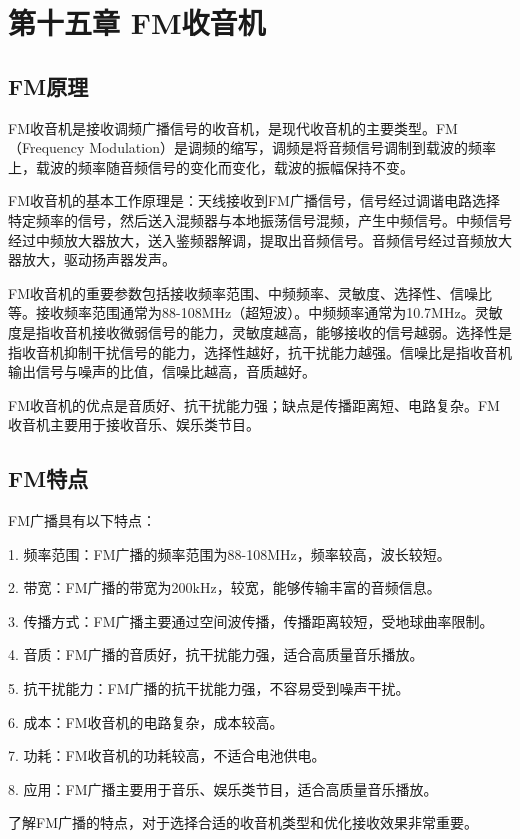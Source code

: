 \documentclass[12pt,UTF8]{ctexbook}
\begin{document}
\chapter{第十五章 FM收音机}

\section{FM原理}

FM收音机是接收调频广播信号的收音机，是现代收音机的主要类型。FM（Frequency Modulation）是调频的缩写，调频是将音频信号调制到载波的频率上，载波的频率随音频信号的变化而变化，载波的振幅保持不变。

FM收音机的基本工作原理是：天线接收到FM广播信号，信号经过调谐电路选择特定频率的信号，然后送入混频器与本地振荡信号混频，产生中频信号。中频信号经过中频放大器放大，送入鉴频器解调，提取出音频信号。音频信号经过音频放大器放大，驱动扬声器发声。

FM收音机的重要参数包括接收频率范围、中频频率、灵敏度、选择性、信噪比等。接收频率范围通常为88-108MHz（超短波）。中频频率通常为10.7MHz。灵敏度是指收音机接收微弱信号的能力，灵敏度越高，能够接收的信号越弱。选择性是指收音机抑制干扰信号的能力，选择性越好，抗干扰能力越强。信噪比是指收音机输出信号与噪声的比值，信噪比越高，音质越好。

FM收音机的优点是音质好、抗干扰能力强；缺点是传播距离短、电路复杂。FM收音机主要用于接收音乐、娱乐类节目。

\section{FM特点}

FM广播具有以下特点：

1. 频率范围：FM广播的频率范围为88-108MHz，频率较高，波长较短。

2. 带宽：FM广播的带宽为200kHz，较宽，能够传输丰富的音频信息。

3. 传播方式：FM广播主要通过空间波传播，传播距离较短，受地球曲率限制。

4. 音质：FM广播的音质好，抗干扰能力强，适合高质量音乐播放。

5. 抗干扰能力：FM广播的抗干扰能力强，不容易受到噪声干扰。

6. 成本：FM收音机的电路复杂，成本较高。

7. 功耗：FM收音机的功耗较高，不适合电池供电。

8. 应用：FM广播主要用于音乐、娱乐类节目，适合高质量音乐播放。

了解FM广播的特点，对于选择合适的收音机类型和优化接收效果非常重要。
\end{document}
